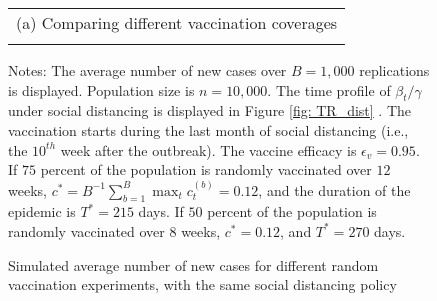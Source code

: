 \documentclass[12pt]{article}
\begin{document}
\begin{figure}[tp]%
\caption
{Simulated average number of new cases for different random vaccination experiments, with the same social distancing policy}%
\label{fig: vacc_suppl}%
\begin{footnotesize}%


\begin{center}%
\begin{tabular}
[c]{c}%
(a) Comparing different vaccination coverages%
\vspace{0.2cm}%
\\%
{\includegraphics[
height=1.9951in,
width=2.6524in
]%
{figs/theory_cmp_vacc_pct_dist_eff95_Wbeg10_dcT.png}%
}
\end{tabular}



\end{center}

%

\vspace{-0.2cm}%
Notes: The average number of new cases over $B=1,000$ replications is
displayed. Population size is $n=10,000$. The time profile of $\beta
_{t}/\gamma$ under social distancing is displayed in Figure \ref{fig: TR_dist}%
. The vaccination starts during the last month of social distancing (i.e., the
$10^{th}$ week after the outbreak). The vaccine efficacy is $\epsilon
_{v}=0.95$. If $75$ percent of the population is randomly vaccinated over $12$
weeks, $c^{\ast}=B^{-1}\sum_{b=1}^{B}\max_{t}c_{t}^{(b)}=0.12$, and the
duration of the epidemic is $T^{\ast}=215$ days. If $50$ percent of the
population is randomly vaccinated over $8$ weeks, $c^{\ast}=0.12$, and
$T^{\ast}=270$ days.%


\end{footnotesize}
\end{figure}
\end{document}
